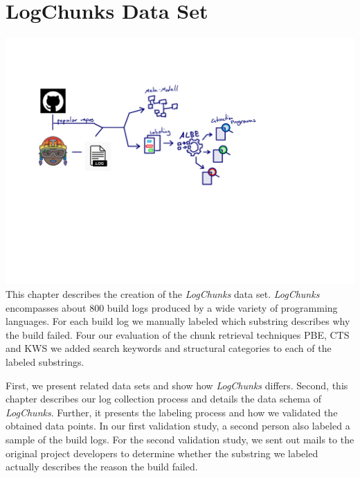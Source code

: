 \documentclass[\myrootdir/main.tex]{subfiles}
\begin{document}
\chapter{LogChunks Data Set}
\label{sec:data-set}
\includegraphics[page=5, width=\textwidth, trim={0.5cm 0.5cm 0.5cm 0.5cm}, clip]{img/flow-of-research.pdf}
This chapter describes the creation of the \emph{LogChunks} data set.
\emph{LogChunks} encompasses about 800 build logs produced by a wide variety of programming languages.
For each build log we manually labeled which substring describes why the build failed.
Four our evaluation of the chunk retrieval techniques PBE, CTS and KWS we added search keywords and structural categories to each of the labeled substrings.

First, we present related data sets and show how \emph{LogChunks} differs.
Second, this chapter describes our log collection process and details the data schema of \emph{LogChunks}.
Further, it presents the labeling process and how we validated the obtained data points.
In our first validation study, a second person also labeled a sample of the build logs.
For the second validation study, we sent out mails to the original project developers to determine whether the substring we labeled actually describes the reason the build failed.
\end{document}

